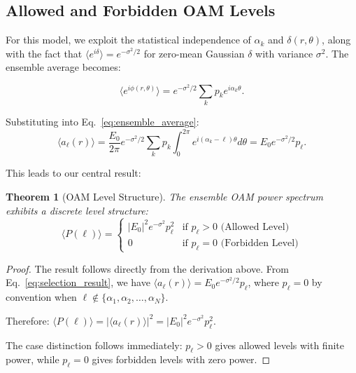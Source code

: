 \documentclass[a4paper,12pt]{article}
\newtheorem{theorem}{Theorem}[section]
\newcommand{\ev}[1]{\langle #1 \rangle}
\begin{document}
\subsection{Allowed and Forbidden OAM Levels}

For this model, we exploit the statistical independence of $\alpha_k$ and $\delta(r,\theta)$, along with the fact 
that $\ev{e^{i\delta}} = e^{-\sigma^2/2}$ for zero-mean Gaussian $\delta$ with variance $\sigma^2$. 
The ensemble average becomes:

\begin{equation}
    \ev{e^{i\phi(r,\theta)}} = e^{-\sigma^2/2} \sum_k p_k e^{i\alpha_k \theta}.
    \label{eq:ensemble_phase}
\end{equation}

Substituting into Eq.~\ref{eq:ensemble_average}:
\begin{equation}
    \ev{a_\ell(r)} = \frac{E_0}{2\pi} e^{-\sigma^2/2} \sum_k p_k \int_0^{2\pi} e^{i(\alpha_k - \ell)\theta} d\theta = E_0 e^{-\sigma^2/2} p_\ell.
    \label{eq:selection_result}
\end{equation}

This leads to our central result:

\begin{theorem}[OAM Level Structure]
The ensemble OAM power spectrum exhibits a discrete level structure:
\begin{equation}
    \ev{P(\ell)} = \begin{cases}
        |E_0|^2 e^{-\sigma^2} p_\ell^2 & \text{if } p_\ell > 0 \text{ (Allowed Level)} \\
        0 & \text{if } p_\ell = 0 \text{ (Forbidden Level)}
    \end{cases}
    \label{eq:level_structure}
\end{equation}
\label{theorem:OAM Level Structure}
\end{theorem}

\begin{proof}
The result follows directly from the derivation above. From Eq.~\ref{eq:selection_result}, we have $\ev{a_\ell(r)} = E_0 e^{-\sigma^2/2} p_\ell$, where $p_\ell = 0$ by convention when $\ell \notin \{\alpha_1, \alpha_2, \ldots, \alpha_N\}$.

Therefore: $\ev{P(\ell)} = |\ev{a_\ell(r)}|^2 = |E_0|^2 e^{-\sigma^2} p_\ell^2$.

The case distinction follows immediately: $p_\ell > 0$ gives allowed levels with finite power, while $p_\ell = 0$ gives forbidden levels with zero power.
\end{proof}
\end{document}

